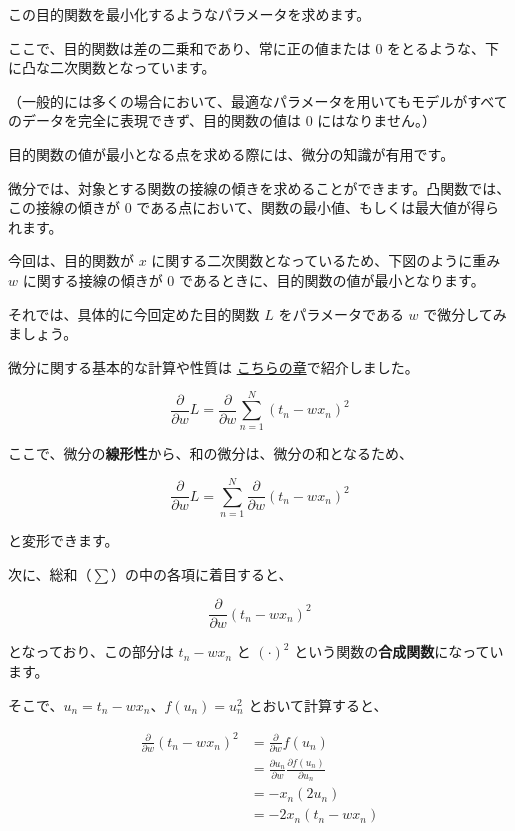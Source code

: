 この目的関数を最小化するようなパラメータを求めます。

ここで、目的関数は差の二乗和であり、常に正の値または $0$ をとるような、下に凸な二次関数となっています。

（一般的には多くの場合において、最適なパラメータを用いてもモデルがすべてのデータを完全に表現できず、目的関数の値は $0$ にはなりません。）


目的関数の値が最小となる点を求める際には、微分の知識が有用です。

微分では、対象とする関数の接線の傾きを求めることができます。凸関数では、この接線の傾きが 0 である点において、関数の最小値、もしくは最大値が得られます。

今回は、目的関数が $x$ に関する二次関数となっているため、下図のように重み $w$ に関する接線の傾きが $0$ であるときに、目的関数の値が最小となります。




それでは、具体的に今回定めた目的関数 $L$ をパラメータである $w$ で微分してみましょう。

微分に関する基本的な計算や性質は \href{https://tutorials.chainer.org/ja/04_Basics_of_Differential.html}{こちらの章}で紹介しました。


\[
\frac{\partial}{\partial w} L
= \frac{\partial}{\partial w} \sum_{n=1}^N (t_n - wx_n)^2
\]


ここで、微分の\textbf{線形性}から、和の微分は、微分の和となるため、


\[
\frac{\partial}{\partial w} L
= \sum_{n=1}^N \frac{\partial}{\partial w} (t_n - wx_n)^2
\]


と変形できます。


次に、総和（$\sum$）の中の各項に着目すると、


\[
\frac{\partial}{\partial w} (t_n - wx_n)^2
\]


となっており、この部分は $t_n - wx_n$ と $(\cdot)^2$ という関数の\textbf{合成関数}になっています。

そこで、$u_n = t_n - wx_n$、$f(u_n) = u_n^2$ とおいて計算すると、


\[
\begin{aligned}
\frac{\partial}{\partial w}(t_n - wx_n)^2
&= \frac{\partial}{\partial w} f(u_n) \\
&= \frac{\partial u_n}{\partial w}\frac{\partial f(u_n)}{\partial u_n} \\
&= -x_n (2 u_n) \\
&= -2x_n(t_n - wx_n)
\end{aligned}
\]


